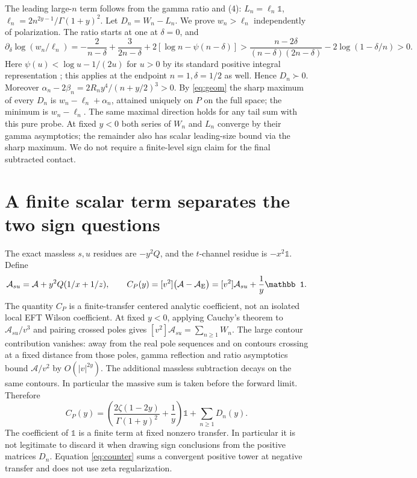 \documentclass[11pt]{article}
\newcommand{\I}{\mathbb 1}
\newcommand{\cA}{\mathcal A}
\begin{document}
The leading large-$n$ term follows from the gamma ratio and (4):
$L_n=\ell_n\I$, $\ell_n=2 n^{2y-1}/\Gamma(1+y)^2$.
Let $D_n=W_n-L_n$. We prove $w_n>\ell_n$ independently of
polarization. The ratio starts at one at $\delta=0$, and
\begin{equation}
 \partial_\delta\log(w_n/\ell_n)
 =-\frac2{n-\delta}+\frac3{2n-\delta}
      +2[\log n-\psi(n-\delta)]
 > \frac{n-2\delta}{(n-\delta)(2n-\delta)}
      -2\log(1-\delta/n)>0 .
\end{equation}
Here $\psi(u)<\log u-1/(2u)$ for $u>0$ by its standard positive
integral representation \cite{nist}; this applies at the endpoint
$n=1,\delta=1/2$ as well. Hence $D_n\succ0$.
Moreover $\alpha_n-2\beta_n=2R_ny^4/(n+y/2)^3>0$.
By \eqref{eq:geom} the sharp maximum of every $D_n$ is
$w_n-\ell_n+\alpha_n$, attained uniquely on $P$ on the full space;
the minimum is $w_n-\ell_n$. The same maximal direction holds for any
tail sum with this pure probe. At fixed $y<0$ both series of
$W_n$ and $L_n$ converge by their gamma asymptotics; the remainder also
has scalar leading-size bound via the sharp maximum. We do not require
a finite-level sign claim for the final subtracted contact.

\section{A finite scalar term separates the two sign questions}
The exact massless $s,u$ residues are $-y^2Q$, and the $t$-channel
residue is $-x^2\I$. Define
\begin{equation}
 \cA_{su}=\cA+y^2Q(1/x+1/z),\qquad
 C_P(y)=[v^2]\big(\cA-\cA_{\rm E}\big)
       =[v^2]\cA_{su}+ \frac1y\I.
 \label{eq:contactdef}
\end{equation}
The quantity $C_P$ is a finite-transfer centered analytic coefficient,
not an isolated local EFT Wilson coefficient. At fixed $y<0$, applying
Cauchy's theorem to $\cA_{su}/v^3$ and pairing crossed poles gives
$[v^2]\cA_{su}=\sum_{n\ge1}W_n$. The large contour contribution vanishes:
away from the real pole sequences and on contours crossing at a fixed
distance from those poles, gamma reflection and ratio asymptotics
bound $\cA/v^2$ by $O(|v|^{2y})$. The additional massless subtraction
decays on the same contours. In particular the massive sum is taken
before the forward limit. Therefore
\begin{equation}
 C_P(y)=\left(\frac{2\zeta(1-2y)}{\Gamma(1+y)^2}+\frac1y\right)\I
            +\sum_{n\ge1}D_n(y).
 \label{eq:counter}
\end{equation}
The coefficient of $\I$ is a finite term at fixed nonzero transfer.
In particular it is not legitimate to discard it when drawing sign
conclusions from the positive matrices $D_n$. Equation
\eqref{eq:counter} sums a convergent positive tower at negative
transfer and does not use zeta regularization.
\end{document}
